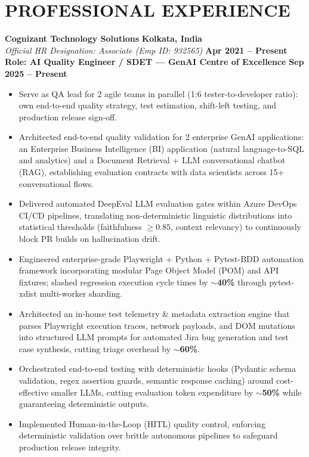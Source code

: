 \documentclass[10pt,a4paper]{article}
\begin{document}
\section{PROFESSIONAL EXPERIENCE}
\footnotesize
\noindent
\textbf{Cognizant Technology Solutions} \hfill \textbf{Kolkata, India}\\
\textit{Official HR Designation: Associate (Emp ID: 932565)} \hfill \textbf{Apr 2021 -- Present}\\[1pt]
\textbf{Role: AI Quality Engineer / SDET --- GenAI Centre of Excellence} \hfill \textbf{Sep 2025 -- Present}
\begin{itemize}[leftmargin=*,noitemsep,topsep=1pt]
    \item Serve as QA lead for 2 agile teams in parallel (1:6 tester-to-developer ratio): own end-to-end quality strategy, test estimation, shift-left testing, and production release sign-off.
    \item Architected end-to-end quality validation for 2 enterprise GenAI applications: an Enterprise Business Intelligence (BI) application (natural language-to-SQL and analytics) and a Document Retrieval + LLM conversational chatbot (RAG), establishing evaluation contracts with data scientists across 15+ conversational flows.
    \item Delivered automated DeepEval LLM evaluation gates within Azure DevOps CI/CD pipelines, translating non-deterministic linguistic distributions into statistical thresholds (faithfulness $\ge 0.85$, context relevancy) to continuously block PR builds on hallucination drift.
    \item Engineered enterprise-grade Playwright + Python + Pytest-BDD automation framework incorporating modular Page Object Model (POM) and API fixtures; slashed regression execution cycle times by \textbf{$\sim$40\%} through pytest-xdist multi-worker sharding.
    \item Architected an in-house test telemetry \& metadata extraction engine that parses Playwright execution traces, network payloads, and DOM mutations into structured LLM prompts for automated Jira bug generation and test case synthesis, cutting triage overhead by \textbf{$\sim$60\%}.
    \item Orchestrated end-to-end testing with deterministic hooks (Pydantic schema validation, regex assertion guards, semantic response caching) around cost-effective smaller LLMs, cutting evaluation token expenditure by \textbf{$\sim$50\%} while guaranteeing deterministic outputs.
    \item Implemented Human-in-the-Loop (HITL) quality control, enforcing deterministic validation over brittle autonomous pipelines to safeguard production release integrity.
\end{itemize}
\end{document}
